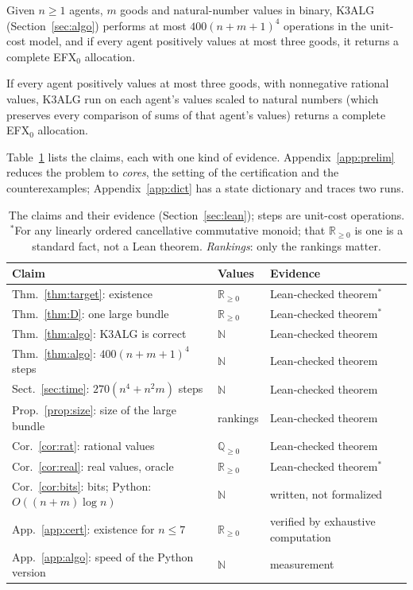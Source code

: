 \documentclass[runningheads,11pt]{llncs}
\newcommand{\efxz}{\texorpdfstring{\mbox{EFX$_0$}}{EFX0}}
\begin{document}
\begin{theorem}[algorithm]\label{thm:algo}
Given $n\ge1$ agents, $m$ goods and natural-number values in binary, K3ALG (Section~\ref{sec:algo}) performs at most $400(n+m+1)^4$ operations in the unit-cost model, and if every agent positively values at most three goods, it returns a complete \efxz{} allocation.
\end{theorem}

\begin{corollary}\label{cor:rat}
If every agent positively values at most three goods, with nonnegative rational values, K3ALG run on each agent's values scaled to natural numbers (which preserves every comparison of sums of that agent's values) returns a complete \efxz{} allocation.
\end{corollary}

\noindent Table~\ref{tab:status} lists the claims, each with one kind of evidence. Appendix~\ref{app:prelim} reduces the problem to \emph{cores}, the setting of the certification and the counterexamples; Appendix~\ref{app:dict} has a state dictionary and traces two runs.

\begin{table}[t]
\caption{The claims and their evidence (Section~\ref{sec:lean}); steps are unit-cost operations. $^*$For any linearly ordered cancellative commutative monoid; that $\mathbb{R}_{\ge0}$ is one is a standard fact, not a Lean theorem. \emph{Rankings}: only the rankings matter.}\label{tab:status}
\centering\small
\setlength{\tabcolsep}{4pt}\begin{tabular}{@{}lll@{}}
\toprule
Claim & Values & Evidence \\
\midrule
Thm.~\ref{thm:target}: existence & $\mathbb{R}_{\ge0}$ & Lean-checked theorem$^*$ \\
Thm.~\ref{thm:D}: one large bundle & $\mathbb{R}_{\ge0}$ & Lean-checked theorem$^*$ \\
Thm.~\ref{thm:algo}: K3ALG is correct & $\mathbb{N}$ & Lean-checked theorem \\
Thm.~\ref{thm:algo}: $400(n+m+1)^4$ steps & $\mathbb{N}$ & Lean-checked theorem \\
Sect.~\ref{sec:time}: $270(n^4+n^2m)$ steps & $\mathbb{N}$ & Lean-checked theorem \\
Prop.~\ref{prop:size}: size of the large bundle & rankings & Lean-checked theorem \\
Cor.~\ref{cor:rat}: rational values & $\mathbb{Q}_{\ge0}$ & Lean-checked theorem \\
Cor.~\ref{cor:real}: real values, oracle & $\mathbb{R}_{\ge0}$ & Lean-checked theorem$^*$ \\
Cor.~\ref{cor:bits}: bits; Python: $O((n+m)\log n)$ & $\mathbb{N}$ & written, not formalized \\
App.~\ref{app:cert}: existence for $n\le7$ & $\mathbb{R}_{\ge0}$ & verified by exhaustive computation \\
App.~\ref{app:algo}: speed of the Python version & $\mathbb{N}$ & measurement \\
\bottomrule
\end{tabular}
\end{table}
\end{document}

